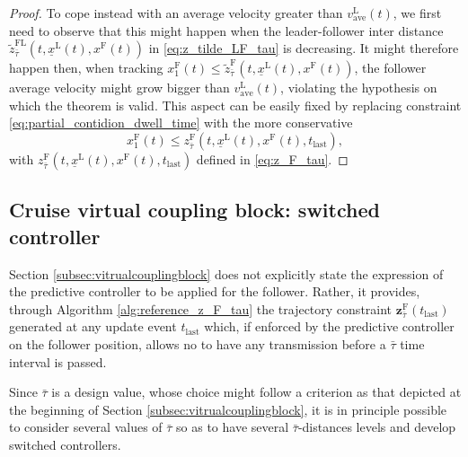 \begin{proof}
	To cope instead with an average velocity greater than $v_{\mathrm{ave}}^\mathrm{L}(t)$, we first need to observe that this might happen when the leader-follower inter distance $\tilde{z}^{\mathrm{FL}}_{\bar{\tau}} (t,\underline{x}^\mathrm{L}(t),x^\mathrm{F}(t))$ in \eqref{eq:z_tilde_LF_tau} is decreasing. It might therefore happen then, when tracking $x_1^\mathrm{F}(t)\leq \tilde{z}^{\mathrm{F}}_{\bar{\tau}} (t,\underline{x}^\mathrm{L}(t),x^\mathrm{F}(t))$, the follower average velocity might grow bigger than $v_{\mathrm{ave}}^\mathrm{L}(t)$, violating the hypothesis on which the theorem is valid. This aspect can be easily fixed by replacing constraint \eqref{eq:partial_contidion_dwell_time} with the more conservative
	\begin{equation}\label{eq:dwell_time}
		x_1^\mathrm{F}(t)\leq z_{\bar{\tau}}^\mathrm{F}(t,\underline{x}^\mathrm{L}(t),x^\mathrm{F}(t),t_{\mathrm{last}}),
	\end{equation}
	with $z_{\bar{\tau}}^\mathrm{F}(t,\underline{x}^\mathrm{L}(t),x^\mathrm{F}(t),t_{\mathrm{last}})$ defined in \eqref{eq:z_F_tau}.
\end{proof}





\subsection{Cruise virtual coupling block: switched controller}
\label{subsec:switchedvitrualcouplingblock}  

Section \ref{subsec:vitrualcouplingblock} does not explicitly state the expression of the predictive controller to be applied for the follower. Rather, it provides, through  Algorithm \ref{alg:reference_z_F_tau} the trajectory constraint $\mathbf{z}_{\bar{\tau}}^\mathrm{F}(t_{\mathrm{last}})$ generated at any update event $t_{\mathrm{last}}$ which, if enforced by the predictive controller on the follower position, allows no to have any transmission before a $\bar{\tau}$ time interval is passed. 

Since $\bar{\tau}$ is a design value, whose choice might follow a criterion as that depicted at the beginning of Section \ref{subsec:vitrualcouplingblock}, it is in principle possible to consider several values of $\bar{\tau}$ so as to have several $\bar{\tau}$-distances levels and develop switched controllers. 

